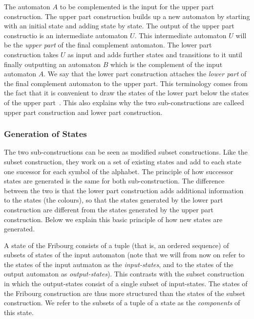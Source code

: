 The automaton $A$ to be complemented is the input for the upper part construction. The upper part construction builds up a new automaton by starting with an initial state and adding state by state. The output of the upper part constructio is an intermediate automaton $U$. This intermediate automaton $U$ will be the \textit{upper part} of the final complement automaton. The lower part construction takes $U$ as input and adds further states and transitions to it until finally outputting an automaton $B$ which is the complement of the input automaton $A$. We say that the lower part construction attaches the \textit{lower part} of the final complement automaton to the upper part. This terminology comes from the fact that it is convenient to draw the states of the lower part below the states of the upper part~\cite{2014_joel_ulrich}. This also explains why the two sub-constructions are calleed upper part construction and lower part construction.


\subsubsection{Generation of States}
The two sub-constructions can be seen as modified subset constructions. Like the subset construction, they work on a set of existing states and add to each state one sucessor for each symbol of the alphabet. The principle of how successor states are generated is the same for both sub-construction. The difference between the two is that the lower part construction adds additional information to the states (the colours), so that the states generated by the lower part construction are different from the states generated by the upper part construction. Below we explain this basic principle of how new states are generated.

A state of the Fribourg consists of a tuple (that is, an ordered sequence) of subsets of states of the input automaton (note that we will from now on refer to the states of the input autmaton as the \textit{input-states}, and to the states of the output automaton as \textit{output-states}). This contrasts with the subset construction in which the output-states consist of a single subset of input-states. The states of the Fribourg construction are thus more structured than the states of the subset construction. We refer to the subsets of a tuple of a state as the \textit{components} of this state.

